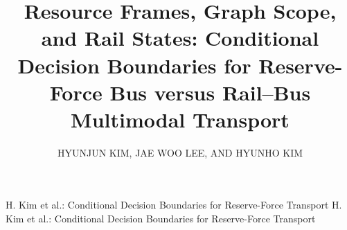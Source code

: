\documentclass{ieeeaccess}
\begin{document}
\doi{}

\title{Resource Frames, Graph Scope, and Rail States: Conditional Decision Boundaries for Reserve-Force Bus versus Rail--Bus Multimodal Transport}

\author{\uppercase{Hyunjun Kim},
\uppercase{Jae Woo Lee}, AND \uppercase{Hyunho Kim}}

\address[1]{Korea Military Academy, Seoul 01805, Republic of Korea}
\address[2]{Korea Advanced Institute of Science and Technology (KAIST), Daejeon, Republic of Korea (e-mail: hyunjun1121@kaist.ac.kr)}
\address[3]{CHA University, Seongnam, Republic of Korea (e-mail: simonlee98@chauniv.ac.kr)}

\markboth
{H. Kim et al.: Conditional Decision Boundaries for Reserve-Force Transport}
{H. Kim et al.: Conditional Decision Boundaries for Reserve-Force Transport}

\end{document}
